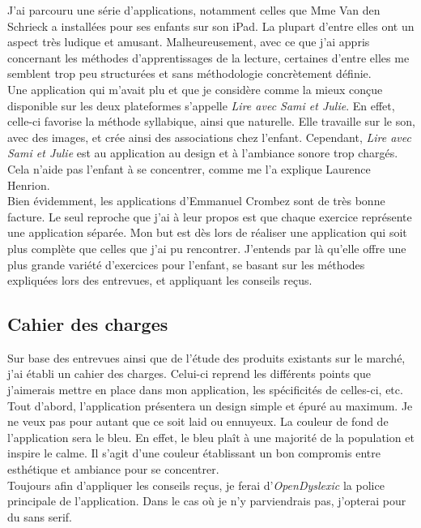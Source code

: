 J'ai parcouru une série d'applications, notamment celles que Mme Van den Schrieck a installées pour ses enfants sur son iPad. La plupart d'entre elles ont un aspect très ludique et amusant. Malheureusement, avec ce que j'ai appris concernant les méthodes d'apprentissages de la lecture, certaines d'entre elles me semblent trop peu structurées et sans méthodologie concrètement définie.\\

Une application qui m'avait plu et que je considère comme la mieux conçue disponible sur les deux plateformes s'appelle \textit{Lire avec Sami et Julie}. En effet, celle-ci favorise la méthode syllabique, ainsi que naturelle. Elle travaille sur le son, avec des images, et crée ainsi des associations chez l'enfant. Cependant, \textit{Lire avec Sami et Julie} est au application au design et à l'ambiance sonore trop chargés. Cela n'aide pas l'enfant à se concentrer, comme me l'a explique Laurence Henrion.\\

Bien évidemment, les applications d'Emmanuel Crombez sont de très bonne facture. Le seul reproche que j'ai à leur propos est que chaque exercice représente une application séparée. Mon but est dès lors de réaliser une application qui soit plus complète que celles que j'ai pu rencontrer. J'entends par là qu'elle offre une plus grande variété d'exercices pour l'enfant, se basant sur les méthodes expliquées lors des entrevues, et appliquant les conseils reçus.

\subsection{Cahier des charges}
Sur base des entrevues ainsi que de l'étude des produits existants sur le marché, j'ai établi un cahier des charges. Celui-ci reprend les différents points que j'aimerais mettre en place dans mon application, les spécificités de celles-ci, etc.\\

Tout d'abord, l'application présentera un design simple et épuré au maximum. Je ne veux pas pour autant que ce soit laid ou ennuyeux. La couleur de fond de l'application sera le bleu. En effet, le bleu plaît à une majorité de la population et inspire le calme. Il s'agit d'une couleur établissant un bon compromis entre esthétique et ambiance pour se concentrer.\\

Toujours afin d'appliquer les conseils reçus, je ferai d'\textit{OpenDyslexic} la police principale de l'application. Dans le cas où je n'y parviendrais pas, j'opterai pour du sans serif.\\

